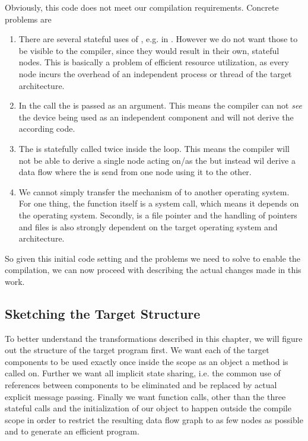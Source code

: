  Obviously, this code does not meet our compilation requirements. Concrete problems are 
\begin{enumerate}
    \item There are several stateful uses of , e.g. in . However we do not want those to be visible to the compiler, since they would result in their own, stateful nodes. This is basically a problem of efficient resource utilization, as every node incurs the overhead of an independent process or thread of the target architecture.  
    \item In the call  the  is passed as an argument. This means the compiler can not \emph{see} the device being used as an independent component and will not derive the according code.
    \item The  is statefully called twice inside the loop. This means the compiler will not be able to derive a single node acting on/as the  but instead wil derive a data flow where the  is send from one node using it to the other. 
    \item We cannot simply transfer the mechanism of  to another operating system. For one thing, the function itself is a system call, which means it depends on the operating system. Secondly,  is a file pointer and the handling of pointers and files is also strongly dependent on the target operating system and architecture.
\end{enumerate}

So given this initial code setting and the problems we need to solve to enable the compilation, we can now proceed with describing the actual changes made in this work. 

\subsection{Sketching the Target Structure}

To better understand the transformations described in this chapter, we will figure out the structure of the target program first. We want each of the target components to be used exactly once inside the scope as an object a method is called on. Further we want all implicit state sharing, i.e. the common use of references between components to be eliminated and be replaced by actual explicit message passing. Finally we want function calls, other than the three stateful calls and the initialization of our object to happen outside the compile scope in order to restrict the resulting data flow graph to as few nodes as possible and to generate an efficient program. \\

